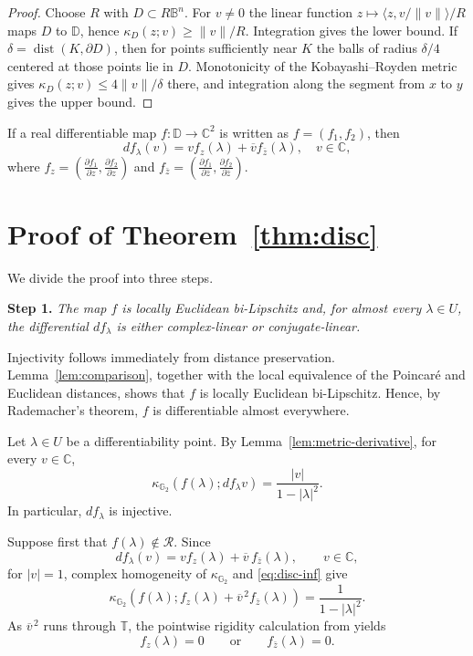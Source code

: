 \documentclass[12pt]{amsart}
\newcommand{\DD}{\mathbb D}
\newcommand{\CC}{\mathbb C}
\newcommand{\GG}{\mathbb G_2}
\newcommand{\cR}{\mathcal R}
\begin{document}
\begin{proof}
Choose $R$ with $D\subset R\mathbb B^n$.  For $v\ne0$ the linear function
$z\mapsto\langle z,v/\|v\|\rangle/R$ maps $D$ to $\DD$, hence
$\kappa_D(z;v)\ge\|v\|/R$.  Integration gives the lower bound.  If
$\delta=\operatorname{dist}(K,\partial D)$, then for points sufficiently near $K$ the balls
of radius $\delta/4$ centered at those points lie in $D$.  Monotonicity of the
Kobayashi--Royden metric gives $\kappa_D(z;v)\le4\|v\|/\delta$ there, and
integration along the segment from $x$ to $y$ gives the upper bound.
\end{proof}

If a real differentiable map $f:\DD\to\CC^2$ is written as $f=(f_1,f_2)$, then 
$$
df_{\lambda}(v)=v f_z(\lambda)+\overline v f_{\bar z}(\lambda),\quad v\in\CC,
$$
where $f_z=(\frac{\partial f_1}{\partial z},\frac{\partial f_2}{\partial z})$ and
$f_{\bar z}=(\frac{\partial f_1}{\partial \bar z},\frac{\partial f_2}{\partial\bar z})$.



\section{Proof of Theorem~\ref{thm:disc}}

We divide the proof into three steps.

\medskip

\noindent
\textbf{Step 1.}
\emph{The map $f$ is locally Euclidean bi-Lipschitz and, for almost every
$\lambda\in U$, the differential $df_\lambda$ is either complex-linear or
conjugate-linear.}

\medskip

Injectivity follows immediately from distance preservation.
Lemma~\ref{lem:comparison}, together with the local equivalence of the
Poincar\'e and Euclidean distances, shows that $f$ is locally Euclidean
bi-Lipschitz. Hence, by Rademacher's theorem, $f$ is differentiable almost
everywhere.

Let $\lambda\in U$ be a differentiability point. By
Lemma~\ref{lem:metric-derivative}, for every $v\in\CC$,
\begin{equation}\label{eq:disc-inf}
 \kappa_{\GG}(f(\lambda);df_\lambda v)
 =
 \frac{|v|}{1-|\lambda|^2}.
\end{equation}
In particular, $df_\lambda$ is injective.

Suppose first that $f(\lambda)\notin\cR$. Since
\[
 df_\lambda(v)
 =
 v f_z(\lambda)+\overline v\,f_{\bar z}(\lambda),
 \qquad v\in\CC,
\]
for $|v|=1$, complex homogeneity of $\kappa_{\GG}$ and
\eqref{eq:disc-inf} give
\[
 \kappa_{\GG}\left(
 f(\lambda);
 f_z(\lambda)+\overline v^{\,2}f_{\bar z}(\lambda)
 \right)
 =
 \frac1{1-|\lambda|^2}.
\]
As $\overline v^{\,2}$ runs through $\mathbb T$, the pointwise rigidity
calculation from \cite{Edigarian2024} yields
\[
 f_z(\lambda)=0
 \qquad\text{or}\qquad
 f_{\bar z}(\lambda)=0.
\]
\end{document}

